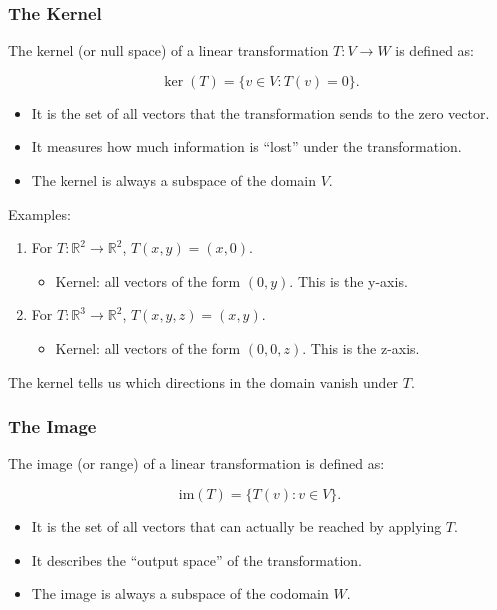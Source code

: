 \documentclass[
  letterpaper,
  DIV=11,
  numbers=noendperiod]{scrreprt}
\providecommand{\tightlist}{%
  \setlength{\itemsep}{0pt}\setlength{\parskip}{0pt}}
\begin{document}
\subsubsection{The Kernel}\label{the-kernel}

The kernel (or null space) of a linear transformation \(T: V \to W\) is
defined as:

\[
\ker(T) = \{ v \in V : T(v) = 0 \}.
\]

\begin{itemize}
\tightlist
\item
  It is the set of all vectors that the transformation sends to the zero
  vector.
\item
  It measures how much information is ``lost'' under the transformation.
\item
  The kernel is always a subspace of the domain \(V\).
\end{itemize}

Examples:

\begin{enumerate}
\def\labelenumi{\arabic{enumi}.}
\item
  For \(T: \mathbb{R}^2 \to \mathbb{R}^2\), \(T(x,y) = (x,0)\).

  \begin{itemize}
  \tightlist
  \item
    Kernel: all vectors of the form \((0,y)\). This is the y-axis.
  \end{itemize}
\item
  For \(T: \mathbb{R}^3 \to \mathbb{R}^2\), \(T(x,y,z) = (x,y)\).

  \begin{itemize}
  \tightlist
  \item
    Kernel: all vectors of the form \((0,0,z)\). This is the z-axis.
  \end{itemize}
\end{enumerate}

The kernel tells us which directions in the domain vanish under \(T\).

\subsubsection{The Image}\label{the-image}

The image (or range) of a linear transformation is defined as:

\[
\text{im}(T) = \{ T(v) : v \in V \}.
\]

\begin{itemize}
\tightlist
\item
  It is the set of all vectors that can actually be reached by applying
  \(T\).
\item
  It describes the ``output space'' of the transformation.
\item
  The image is always a subspace of the codomain \(W\).
\end{itemize}
\end{document}
